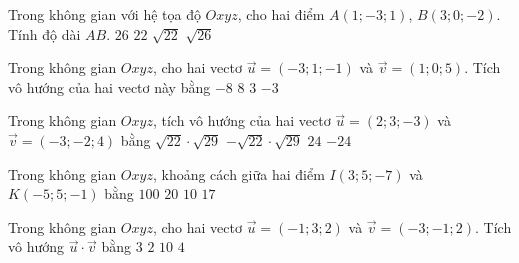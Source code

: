 \begin{ex}%
	Trong không gian với hệ tọa độ  $Oxyz$, cho hai điểm $A(1;-3;1)$, $B(3;0;-2)$. Tính độ dài $AB$.
	\choice 
		 {$26$}
		{$22$} 
		{\True $\sqrt{22}$} 
		 {$\sqrt{26}$}
\end{ex}

\begin{ex}%
	Trong không gian $Oxyz$, cho hai vectơ $\overrightarrow{u}=(-3;1;-1)$ và $\overrightarrow{v}=(1;0;5)$. Tích vô  hướng của hai vectơ này bằng
	 \choice
		{\True  $-8$}
		{$8$} 
		{$3$} 
		{$-3$} 
\end{ex}

\begin{ex}%
	Trong không gian $Oxyz$, tích vô hướng của  hai vectơ $\overrightarrow{u}=(2; 3;-3)$ và $\overrightarrow{v}=(-3; -2; 4)$ bằng
	\choice 
		{$\sqrt{22} \cdot \sqrt{29}$} 
		{$-\sqrt{22}  \cdot \sqrt{29}$}
		{$24 $} 
		{\True $ -24 $} 
\end{ex}

\begin{ex}%
	Trong không gian $Oxyz$, khoảng  cách giữa hai điểm $I(3; 5; -7)$ và $K(-5; 5; -1)$ bằng
	 \choice
		 {$100$}
		{$20$} 
		 {\True$10$}
		 {$17$}
\end{ex}

\begin{ex}%
	Trong không gian $Oxyz$, cho hai vectơ $\overrightarrow{u}=(-1;3;2)$ và $\overrightarrow{v}=(-3;-1;2)$. Tích vô hướng $\overrightarrow{u}  \cdot \overrightarrow{v}$ bằng
	 \choice
		 {$3$}
		 {$2$}
		{$10$} 
		{\True $4$} 
\end{ex}

